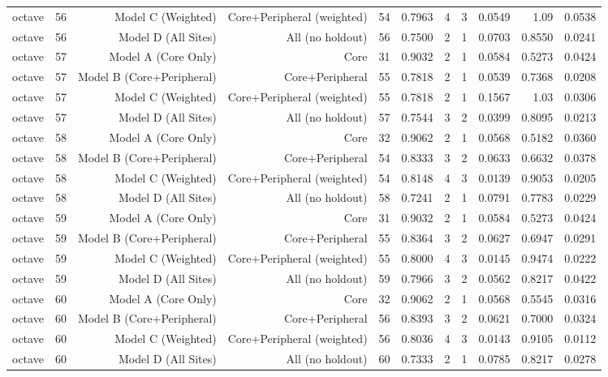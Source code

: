 {\begin{longtable}{lrrrrrrrrrr}
  octave & 56 & Model C (Weighted) & Core+Peripheral (weighted) & 54 & 0.7963 & 4 & 3 & 0.0549 & 1.09 & 0.0538 \\
  octave & 56 & Model D (All Sites) & All (no holdout) & 56 & 0.7500 & 2 & 1 & 0.0703 & 0.8550 & 0.0241 \\
  octave & 57 & Model A (Core Only) & Core & 31 & 0.9032 & 2 & 1 & 0.0584 & 0.5273 & 0.0424 \\
  octave & 57 & Model B (Core+Peripheral) & Core+Peripheral & 55 & 0.7818 & 2 & 1 & 0.0539 & 0.7368 & 0.0208 \\
  octave & 57 & Model C (Weighted) & Core+Peripheral (weighted) & 55 & 0.7818 & 2 & 1 & 0.1567 & 1.03 & 0.0306 \\
  octave & 57 & Model D (All Sites) & All (no holdout) & 57 & 0.7544 & 3 & 2 & 0.0399 & 0.8095 & 0.0213 \\
  octave & 58 & Model A (Core Only) & Core & 32 & 0.9062 & 2 & 1 & 0.0568 & 0.5182 & 0.0360 \\
  octave & 58 & Model B (Core+Peripheral) & Core+Peripheral & 54 & 0.8333 & 3 & 2 & 0.0633 & 0.6632 & 0.0378 \\
  octave & 58 & Model C (Weighted) & Core+Peripheral (weighted) & 54 & 0.8148 & 4 & 3 & 0.0139 & 0.9053 & 0.0205 \\
  octave & 58 & Model D (All Sites) & All (no holdout) & 58 & 0.7241 & 2 & 1 & 0.0791 & 0.7783 & 0.0229 \\
  octave & 59 & Model A (Core Only) & Core & 31 & 0.9032 & 2 & 1 & 0.0584 & 0.5273 & 0.0424 \\
  octave & 59 & Model B (Core+Peripheral) & Core+Peripheral & 55 & 0.8364 & 3 & 2 & 0.0627 & 0.6947 & 0.0291 \\
  octave & 59 & Model C (Weighted) & Core+Peripheral (weighted) & 55 & 0.8000 & 4 & 3 & 0.0145 & 0.9474 & 0.0222 \\
  octave & 59 & Model D (All Sites) & All (no holdout) & 59 & 0.7966 & 3 & 2 & 0.0562 & 0.8217 & 0.0422 \\
  octave & 60 & Model A (Core Only) & Core & 32 & 0.9062 & 2 & 1 & 0.0568 & 0.5545 & 0.0316 \\
  octave & 60 & Model B (Core+Peripheral) & Core+Peripheral & 56 & 0.8393 & 3 & 2 & 0.0621 & 0.7000 & 0.0324 \\
  octave & 60 & Model C (Weighted) & Core+Peripheral (weighted) & 56 & 0.8036 & 4 & 3 & 0.0143 & 0.9105 & 0.0112 \\
  octave & 60 & Model D (All Sites) & All (no holdout) & 60 & 0.7333 & 2 & 1 & 0.0785 & 0.8217 & 0.0278 \\

\end{longtable}}
